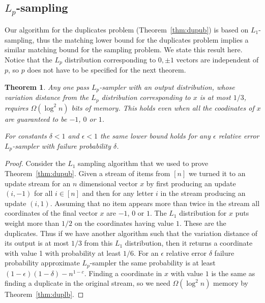\documentclass[9pt,letterpaper]{article}
\newtheorem{theorem}{Theorem}
\theoremstyle{remark}
\begin{document}
\subsection{$L_p$-sampling}
Our algorithm for the duplicates problem (Theorem~\ref{thm:dupub}) is based on
$L_1$-sampling, thus the matching lower bound for the duplicates problem
implies a similar matching bound for the sampling problem. We state this
result here. Notice that the $L_p$ distribution corresponding to $0,\pm1$
vectors are independent of $p$, so $p$ does not have to be specified for the
next theorem.

\begin{theorem}\label{lpl}
Any one pass
$L_p$-sampler with an output distribution,
whose variation distance from the $L_p$ distribution corresponding to $x$ is
at most $1/3$, requires $\Omega(\log^2n)$ bits of memory. This holds even
when all the coodinates of $x$
are
guaranteed to be $-1$, $0$ or $1$.

For constants $\delta<1$ and $\epsilon<1$ the same lower bound holds for any
$\epsilon$ relative error $L_p$-sampler with failure probability $\delta$.
\end{theorem}

\begin{proof}
Consider the $L_1$ sampling algorithm that we used to prove
Theorem~\ref{thm:dupub}. Given a stream of items from $[n]$ we turned it to
an update stream for an $n$ dimensional vector $x$ by first
producing an update $(i,-1)$ for all $i\in[n]$ and then for any letter $i$ in
the stream producing an update $(i,1)$. Assuming that no item appears more
than twice in the stream all coordinates of the final vector $x$ are $-1$, $0$
or $1$. The $L_1$ distribution for $x$ puts weight more than $1/2$ on the
coordinates having value $1$. These are the duplicates. Thus if we have
another algorithm such that the variation distance of its output is at most
$1/3$ from this $L_1$ distribution, then it returns a coordinate with value 1
with probability at least $1/6$. For an $\epsilon$ relative error $\delta$
failure probability approximate $L_p$-sampler the same probability is at least
$(1-\epsilon)(1-\delta)-n^{1-c}$. Finding a coordinate in $x$ with value $1$
is the same as finding a duplicate in the original stream, so we need
$\Omega(\log^2n)$ memory by Theorem~\ref{thm:duplb}.
\end{proof}
\end{document}
